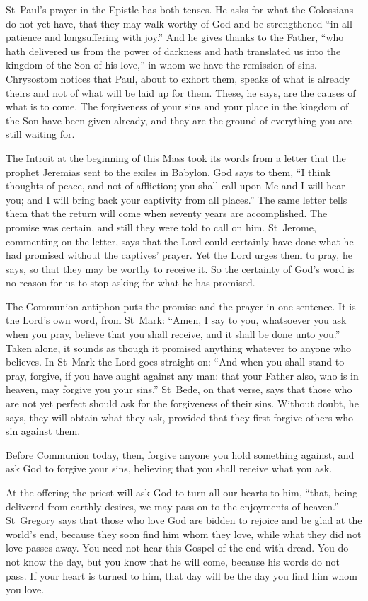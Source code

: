 St~Paul's prayer in the Epistle has both tenses. He asks for what the
Colossians do not yet have, that they may walk worthy of God and be
strengthened ``in all patience and longsuffering with joy.'' And he gives
thanks to the Father, ``who hath delivered us from the power of darkness and
hath translated us into the kingdom of the Son of his love,'' in whom we have
the remission of sins. Chrysostom notices that Paul, about to exhort them,
speaks of what is already theirs and not of what will be laid up for them.
These, he says, are the causes of what is to come. The forgiveness of your
sins and your place in the kingdom of the Son have been given already, and
they are the ground of everything you are still waiting for.

The Introit at the beginning of this Mass took its words from a letter that
the prophet Jeremias sent to the exiles in Babylon. God says to them, ``I
think thoughts of peace, and not of affliction; you shall call upon Me and I
will hear you; and I will bring back your captivity from all places.'' The
same letter tells them that the return will come when seventy years are
accomplished. The promise was certain, and still they were told to call on
him. St~Jerome, commenting on the letter, says that the Lord could certainly
have done what he had promised without the captives' prayer. Yet the Lord
urges them to pray, he says, so that they may be worthy to receive it. So the
certainty of God's word is no reason for us to stop asking for what he has
promised.

The Communion antiphon puts the promise and the prayer in one sentence. It is
the Lord's own word, from St~Mark: ``Amen, I say to you, whatsoever you ask
when you pray, believe that you shall receive, and it shall be done unto
you.'' Taken alone, it sounds as though it promised anything whatever to
anyone who believes. In St~Mark the Lord goes straight on: ``And when you
shall stand to pray, forgive, if you have aught against any man: that your
Father also, who is in heaven, may forgive you your sins.'' St~Bede, on that
verse, says that those who are not yet perfect should ask for the forgiveness
of their sins. Without doubt, he says, they will obtain what they ask,
provided that they first forgive others who sin against them.

Before Communion today, then, forgive anyone you hold something against, and
ask God to forgive your sins, believing that you shall receive what you ask.

At the offering the priest will ask God to turn all our hearts to him, ``that,
being delivered from earthly desires, we may pass on to the enjoyments of
heaven.'' St~Gregory says that those who love God are bidden to rejoice and be
glad at the world's end, because they soon find him whom they love, while what
they did not love passes away. You need not hear this Gospel of the end with
dread. You do not know the day, but you know that he will come, because his
words do not pass. If your heart is turned to him, that day will be the day
you find him whom you love.
